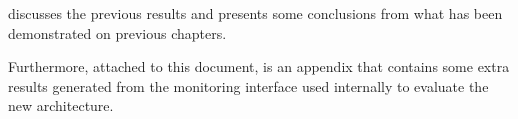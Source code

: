  discusses the previous results and presents some conclusions from what has been demonstrated on previous chapters.

Furthermore, attached to this document, is an appendix that contains some extra results generated from the monitoring interface used internally to evaluate the new architecture.












